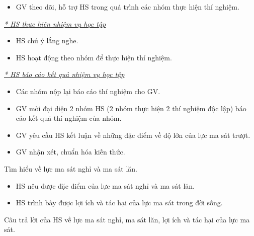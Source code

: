 {\begin{itemize}[label=-]
\begin{itemize}[label=$\bullet$]
\begin{itemize}
\begin{center}
				\end{center}
			\end{itemize}
			\textbf{\textit{Thảo luận và phân tích:}}
			\begin{itemize}
				\item Điều gì xảy ra với độ lớn của lực ma sát trượt khi tăng áp lực lên bề mặt tiếp xúc?
				\item Vẽ đồ thị cho thấy sự thay đổi độ lớn của lực ma sát trượt khi tăng dần độ lớn của áp lực.
			\end{itemize}
		\end{itemize}
		\item GV theo dõi, hỗ trợ HS trong quá trình các nhóm thực hiện thí nghiệm.
		
	\end{itemize}
	\textit{\underline{* HS thực hiện nhiệm vụ học tập}}
	\begin{itemize}[label=-]
		\item HS chú ý lắng nghe.
		\item HS hoạt động theo nhóm để thực hiện thí nghiệm.
	\end{itemize}
	\textit{\underline{* HS báo cáo kết quả nhiệm vụ học tập}}
	\begin{itemize}[label=-]
		\item Các nhóm nộp lại báo cáo thí nghiệm cho GV.
		\item GV mời đại diện 2 nhóm HS (2 nhóm thực hiện 2 thí nghiệm độc lập) báo cáo kết quả thí nghiệm của nhóm.
		\item GV yêu cầu HS kết luận về những đặc điểm về độ lớn của lực ma sát trượt.
		\item GV nhận xét, chuẩn hóa kiến thức.
	\end{itemize}
}
\hoatdong
{Tìm hiểu về lực ma sát nghỉ và ma sát lăn.
}
{\begin{itemize}
		\item HS nêu được đặc điểm của lực ma sát nghỉ và ma sát lăn.
		\item HS trình bày được lợi ích và tác hại của lực ma sát trong đời sống.
	\end{itemize}
}
{Câu trả lời của HS về lực ma sát nghỉ, ma sát lăn, lợi ích và tác hại của lực ma sát.
}
